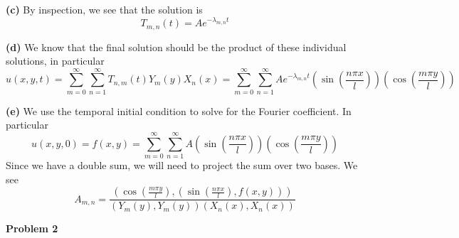 \documentclass[10pt]{article}
\begin{document}
\textbf{(c)}
By inspection, we see that the solution is
$$T_{m,n}(t) = Ae^{-\lambda_{m,n}t}$$

\textbf{(d)}
We know that the final solution should be the product of these individual solutions, in particular
$$u(x,y,t) = \sum_{m=0}^{\infty}\sum_{n=1}^{\infty}T_{n,m}(t)Y_{m}(y)X_{n}(x) =\sum_{m=0}^{\infty}\sum_{n=1}^{\infty} Ae^{-\lambda_{m,n}t}\left(\sin\left(\frac{n\pi x}{l}\right)\right)\left(\cos\left(\frac{m\pi y}{l}\right)\right) $$

\textbf{(e)}
We use the temporal initial condition to solve for the Fourier coefficient. In particular
$$u(x,y,0) = f(x,y)= \sum_{m=0}^{\infty}\sum_{n=1}^{\infty} A\left(\sin\left(\frac{n\pi x}{l}\right)\right)\left(\cos\left(\frac{m\pi y}{l}\right)\right) $$
Since we have a double sum, we will need to project the sum over two bases. We see
$$A_{m,n} = \frac{\left(\cos\left(\frac{m\pi y}{l}\right),\left(\sin\left(\frac{n\pi x}{l}\right),f(x,y)\right)\right)}{\left(Y_{m}(y),Y_{m}(y)\right)\left(X_{n}(x),X_{n}(x)\right)}$$

\newpage
\textbf{Problem 2}
\end{document}
